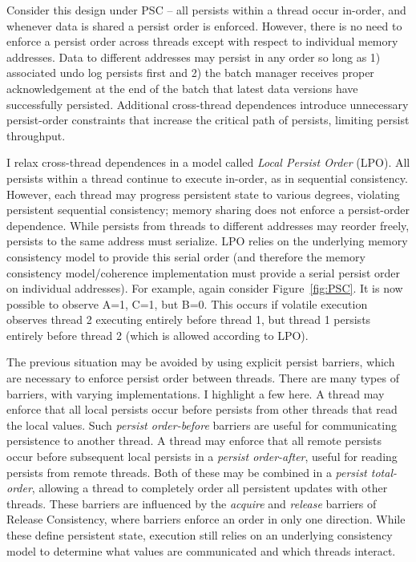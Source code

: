 Consider this design under PSC -- all persists within a thread occur in-order, and whenever data is shared a persist order is enforced.
However, there is no need to enforce a persist order across threads except with respect to individual memory addresses.
Data to different addresses may persist in any order so long as 1) associated undo log persists first and 2) the batch manager receives proper acknowledgement at the end of the batch that latest data versions have successfully persisted.
Additional cross-thread dependences introduce unnecessary persist-order constraints that increase the critical path of persists, limiting persist throughput.

I relax cross-thread dependences in a model called \emph{Local Persist Order} (LPO).
All persists within a thread continue to execute in-order, as in sequential consistency.
However, each thread may progress persistent state to various degrees, violating persistent sequential consistency; memory sharing does not enforce a persist-order dependence.
While persists from threads to different addresses may reorder freely, persists to the same address must serialize.
LPO relies on the underlying memory consistency model to provide this serial order (and therefore the memory consistency model/coherence implementation must provide a serial persist order on individual addresses).
For example, again consider Figure~\ref{fig:PSC}.
It is now possible to observe A=1, C=1, but B=0.
This occurs if volatile execution observes thread 2 executing entirely before thread 1, but thread 1 persists entirely before thread 2 (which is allowed according to LPO).

The previous situation may be avoided by using explicit persist barriers, which are necessary to enforce persist order between threads.
There are many types of barriers, with varying implementations.
I highlight a few here.
A thread may enforce that all local persists occur before persists from other threads that read the local values.
Such \emph{persist order-before} barriers are useful for communicating persistence to another thread.
A thread may enforce that all remote persists occur before subsequent local persists in a \emph{persist order-after}, useful for reading persists from remote threads.
Both of these may be combined in a \emph{persist total-order}, allowing a thread to completely order all persistent updates with other threads.
These barriers are influenced by the \emph{acquire} and \emph{release} barriers of Release Consistency, where barriers enforce an order in only one direction.
While these define persistent state, execution still relies on an underlying consistency model to determine what values are communicated and which threads interact.

